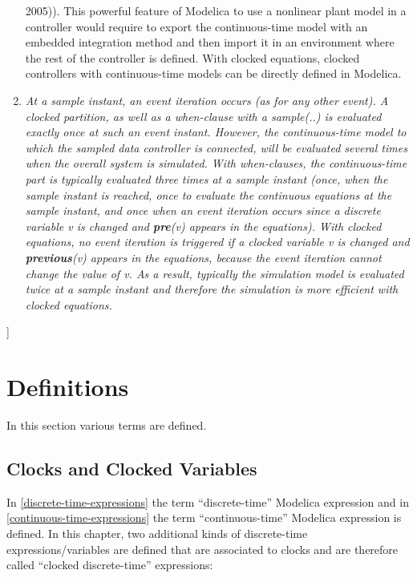 \documentclass[10pt,a4paper]{report}
\def\doublelabel#1{\label{#1}}
\begin{document}
\begin{enumerate}
{  2005)). This powerful feature of Modelica to use a nonlinear plant
  model in a controller would require to export the continuous-time
  model with an embedded integration method and then import it in an
  environment where the rest of the controller is defined. With clocked
  equations, clocked controllers with continuous-time models can be
  directly defined in Modelica.}
\item
  \emph{At a sample instant, an event iteration occurs (as for any other
  event). A clocked partition, as well as a when-clause with a
  sample(..) is evaluated exactly once at such an event instant.
  However, the continuous-time model to which the sampled data
  controller is connected, will be evaluated several times when the
  overall system is simulated. With when-clauses, the continuous-time
  part is typically evaluated three times at a sample instant (once,
  when the sample instant is reached, once to evaluate the continuous
  equations at the sample instant, and once when an event iteration
  occurs since a discrete variable v is changed and \textbf{pre}(v)
  appears in the equations). With clocked equations, no event iteration
  is triggered if a clocked variable v is changed and
  \textbf{previous}(v) appears in the equations, because the event
  iteration cannot change the value of v. As a result, typically the
  simulation model is evaluated twice at a sample instant and therefore
  the simulation is more efficient with clocked equations.}
\end{enumerate}

{]}

\section{Definitions}\doublelabel{definitions}

In this section various terms are defined.

\subsection{Clocks and Clocked Variables}\doublelabel{clocks-and-clocked-variables}

In \ref{discrete-time-expressions} the term ``discrete-time'' Modelica expression and in
\ref{continuous-time-expressions} the term ``continuous-time'' Modelica expression is
defined. In this chapter, two additional kinds of discrete-time
expressions/variables are defined that are associated to clocks and are
therefore called ``clocked discrete-time'' expressions:
\end{document}
